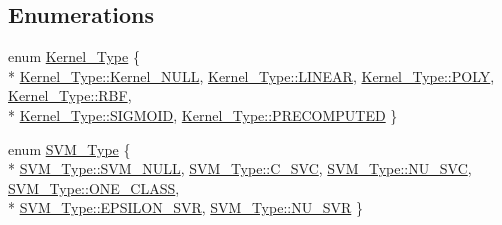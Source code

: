 \subsection*{Enumerations}
\begin{DoxyCompactItemize}
\item 
enum \hyperlink{namespace_s_v_m289___m_f_s_ad985d190115342f6434e0ed8816b6e29}{Kernel\+\_\+\+Type} \{ \\*
\hyperlink{namespace_s_v_m289___m_f_s_ad985d190115342f6434e0ed8816b6e29a5670820806847f66240b7d2af4bea9b6}{Kernel\+\_\+\+Type\+::\+Kernel\+\_\+\+N\+U\+LL}, 
\hyperlink{namespace_s_v_m289___m_f_s_ad985d190115342f6434e0ed8816b6e29aaac544aacc3615aada24897a215f5046}{Kernel\+\_\+\+Type\+::\+L\+I\+N\+E\+AR}, 
\hyperlink{namespace_s_v_m289___m_f_s_ad985d190115342f6434e0ed8816b6e29a711f44effcbd8619148b829b6aa2ed4f}{Kernel\+\_\+\+Type\+::\+P\+O\+LY}, 
\hyperlink{namespace_s_v_m289___m_f_s_ad985d190115342f6434e0ed8816b6e29a745b490764f14c1bbcb73987f0885a37}{Kernel\+\_\+\+Type\+::\+R\+BF}, 
\\*
\hyperlink{namespace_s_v_m289___m_f_s_ad985d190115342f6434e0ed8816b6e29ab299f45b5de2a8f7c45192590290742b}{Kernel\+\_\+\+Type\+::\+S\+I\+G\+M\+O\+ID}, 
\hyperlink{namespace_s_v_m289___m_f_s_ad985d190115342f6434e0ed8816b6e29a7357b64ad4590cd3fd5f9eb934f58e67}{Kernel\+\_\+\+Type\+::\+P\+R\+E\+C\+O\+M\+P\+U\+T\+ED}
 \}
\item 
enum \hyperlink{namespace_s_v_m289___m_f_s_ace392faef6440cf56ebff6b360e7d72a}{S\+V\+M\+\_\+\+Type} \{ \\*
\hyperlink{namespace_s_v_m289___m_f_s_ace392faef6440cf56ebff6b360e7d72aa6bb560c86a8cbe6ebb4904b16c9c3861}{S\+V\+M\+\_\+\+Type\+::\+S\+V\+M\+\_\+\+N\+U\+LL}, 
\hyperlink{namespace_s_v_m289___m_f_s_ace392faef6440cf56ebff6b360e7d72aa87e006eda383b384698dcae5a836951a}{S\+V\+M\+\_\+\+Type\+::\+C\+\_\+\+S\+VC}, 
\hyperlink{namespace_s_v_m289___m_f_s_ace392faef6440cf56ebff6b360e7d72aa675f4e0989ded8312f4219b09dceb508}{S\+V\+M\+\_\+\+Type\+::\+N\+U\+\_\+\+S\+VC}, 
\hyperlink{namespace_s_v_m289___m_f_s_ace392faef6440cf56ebff6b360e7d72aa7dd72415f425dc4258e6ab9b7a72b34b}{S\+V\+M\+\_\+\+Type\+::\+O\+N\+E\+\_\+\+C\+L\+A\+SS}, 
\\*
\hyperlink{namespace_s_v_m289___m_f_s_ace392faef6440cf56ebff6b360e7d72aa9897563968940eea8a211d616ada0cfb}{S\+V\+M\+\_\+\+Type\+::\+E\+P\+S\+I\+L\+O\+N\+\_\+\+S\+VR}, 
\hyperlink{namespace_s_v_m289___m_f_s_ace392faef6440cf56ebff6b360e7d72aac6ca79ef961e189289fc39c8d344cd91}{S\+V\+M\+\_\+\+Type\+::\+N\+U\+\_\+\+S\+VR}
 \}
\end{DoxyCompactItemize}
